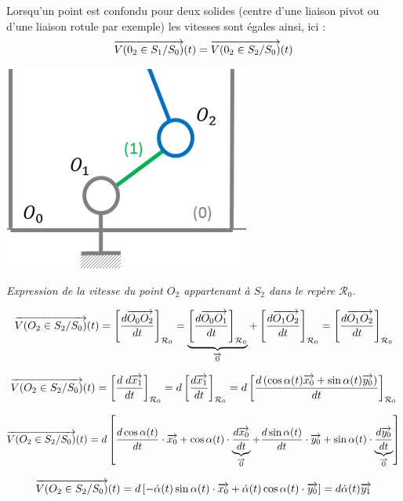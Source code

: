 \documentclass[11pt,oneside]{article}
\begin{document}
\begin{rem}
\begin{minipage}[c]{.65\linewidth}
Lorsqu'un point est confondu pour deux solides (centre d'une liaison pivot ou d'une liaison rotule par exemple) les vitesses sont égales ainsi, ici : 
$$
\overrightarrow{V(0_2\in S_1/S_0)}(t) = \overrightarrow{V(0_2\in S_2/S_0)}(t)
$$
\end{minipage}\hfill
\begin{minipage}[c]{.3\linewidth}
\begin{center}
\includegraphics[width=.8\textwidth]{png/2solides}
\end{center}
\end{minipage}
\end{rem}

\begin{exemple}
\textit{Expression de la vitesse du point $O_2$ appartenant à $S_2$ dans le repère $\mathcal{R}_0$.}

$$
\overrightarrow{V(O_2\in S_2/S_0)}(t) 
= \left[\dfrac{d\overrightarrow{O_0 O_2}}{dt}\right]_{\mathcal{R}_0}
= \underbrace{\left[\dfrac{d\overrightarrow{O_0 O_1}}{dt}\right]_{\mathcal{R}_0}}_{\overrightarrow{0}}+ \left[\dfrac{d\overrightarrow{O_1 O_2}}{dt}\right]_{\mathcal{R}_0}
=\left[\dfrac{d\overrightarrow{O_1 O_2}}{dt}\right]_{\mathcal{R}_0}
$$

$$
\overrightarrow{V(O_2\in S_2/S_0)}(t) 
=\left[\dfrac{d \; d\overrightarrow{x_1}}{dt}\right]_{\mathcal{R}_0}
=d\left[\dfrac{ d\overrightarrow{x_1}}{dt}\right]_{\mathcal{R}_0}
=d\left[\dfrac{ d\left(
\cos\alpha(t)\overrightarrow{x_0}+\sin\alpha(t)\overrightarrow{y_0}
\right)
}{dt}\right]_{\mathcal{R}_0}
$$

$$
\overrightarrow{V(O_2\in S_2/S_0)}(t) 
=d\left[
\dfrac{d\cos\alpha(t)}{dt} \cdot \overrightarrow{x_0}
+\cos\alpha(t)\cdot \underbrace{\dfrac{d\overrightarrow{x_0}}{dt}}_{\overrightarrow{0}}
+\dfrac{d\sin\alpha(t)}{dt} \cdot \overrightarrow{y_0}
+\sin\alpha(t)\cdot \underbrace{\dfrac{d\overrightarrow{y_0}}{dt}}_{\overrightarrow{0}}
\right]
$$

$$
\overrightarrow{V(O_2\in S_2/S_0)}(t) 
=d\left[
-\dot{\alpha}(t)\sin\alpha(t) \cdot \overrightarrow{x_0}
+\dot{\alpha}(t)\cos\alpha(t) \cdot \overrightarrow{y_0}
\right]
=d\dot{\alpha}(t)\overrightarrow{y_1}
$$


\end{exemple}
\end{document}
